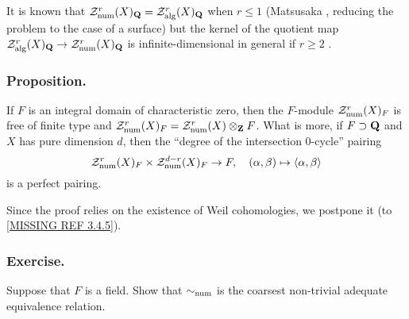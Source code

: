 \documentclass[../main.tex]{subfiles}
\begin{document}
It is known that $\mathcal{Z}^r_{\mathrm{num}}(X)_{\mathbf{Q}} = \mathcal{Z}^r_{\mathrm{alg}}(X)_{\mathbf{Q}}$ when $r \leq 1$ (Matsusaka \cite{matsusaka57}, reducing the problem to the case of a surface) but the kernel of the quotient map $\mathcal{Z}^r_{\mathrm{alg}}(X)_{\mathbf{Q}} \to \mathcal{Z}^r_{\mathrm{num}}(X)_{\mathbf{Q}}$ is infinite-dimensional in general if $r \geq 2$ \cite{Cl83}.

\subsubsection{Proposition.} If $F$ is an integral domain of characteristic zero, then the $F$-module $\mathcal{Z}^r_{\mathrm{num}}(X)_F$ is free of finite type and $\mathcal{Z}^r_{\mathrm{num}}(X)_F = \mathcal{Z}^r_{\mathrm{num}}(X) \otimes_{\mathbf{Z}} F$.
What is more, if $F \supset \mathbf{Q}$ and $X$ has pure dimension $d$, then the \enquote{degree of the intersection $0$-cycle} pairing
$$\mathcal{Z}^r_{\mathrm{num}}(X)_F \times \mathcal{Z}^{d-r}_{\mathrm{num}}(X)_F \to F,\quad (\alpha, \beta) \mapsto \langle \alpha, \beta\rangle$$
is a perfect pairing.

Since the proof relies on the existence of Weil cohomologies, we postpone it (to \ref{MISSING REF 3.4.5}).

\subsubsection{Exercise.} Suppose that $F$ is a field. Show that $\sim_{\mathrm{num}}$ is the coarsest non-trivial adequate equivalence relation.
\end{document}
